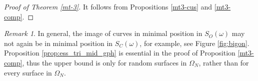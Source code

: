 \documentclass[UTF8]{amsart}
\numberwithin{equation}{section}
\theoremstyle{definition}
\theoremstyle{example}
\theoremstyle{remark}
\newtheorem*{remark}{Remark}
\begin{document}
\begin{proof}[Proof of Theorem \ref{mt-3}]
It follows from Propositions \ref{mt3-cus} and \ref{mt3-comp}.
\end{proof}



\begin{remark}
In general, the image of curves in minimal position in $S_O(\omega)$ may not again be in minimal position in $S_C(\omega)$, for example, see Figure \ref{fig:bigon}. Proposition \ref{prop:ess_tri_mid_gph} is essential in the proof of Proposition \ref{mt3-comp}, thus
the upper bound is only for random surfaces in $\Omega_N$, rather than for every surface in $\Omega_N$.    
\end{remark}

 
 
\end{document}
